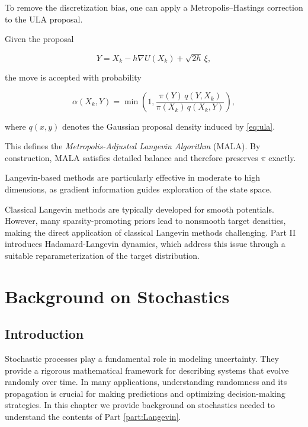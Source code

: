 \documentclass[11pt, twoside]{report}
\begin{document}
To remove the discretization bias, one can apply a Metropolis--Hastings correction 
to the ULA proposal.

Given the proposal

\[
Y = X_k - h\nabla U(X_k) + \sqrt{2h}\,\xi,
\]

the move is accepted with probability

\begin{equation}
\alpha(X_k,Y)
=
\min\!\left(
1,
\frac{\pi(Y)\,q(Y,X_k)}
{\pi(X_k)\,q(X_k,Y)}
\right),
\label{eq:mala_accept}
\end{equation}

where $q(x,y)$ denotes the Gaussian proposal density induced by \eqref{eq:ula}.

This defines the \emph{Metropolis-Adjusted Langevin Algorithm} (MALA). 
By construction, MALA satisfies detailed balance and therefore preserves 
$\pi$ exactly. 

Langevin-based methods are particularly effective in moderate to high dimensions, 
as gradient information guides exploration of the state space. 

Classical Langevin methods are typically developed for smooth
potentials. However, many sparsity-promoting priors lead to
nonsmooth target densities, making the direct application of classical Langevin methods challenging. Part II introduces Hadamard-Langevin dynamics,
which address this issue through a suitable reparameterization of
the target distribution.



\chapter{Background on Stochastics}

\section{Introduction}
Stochastic processes play a fundamental role in modeling uncertainty. They provide a rigorous mathematical framework for describing systems that evolve randomly over time. In many applications, understanding randomness and its propagation is crucial for making predictions and optimizing decision-making strategies. In this chapter we provide background on stochastics needed to understand the contents of Part \ref{part:Langevin}.


\end{document}

